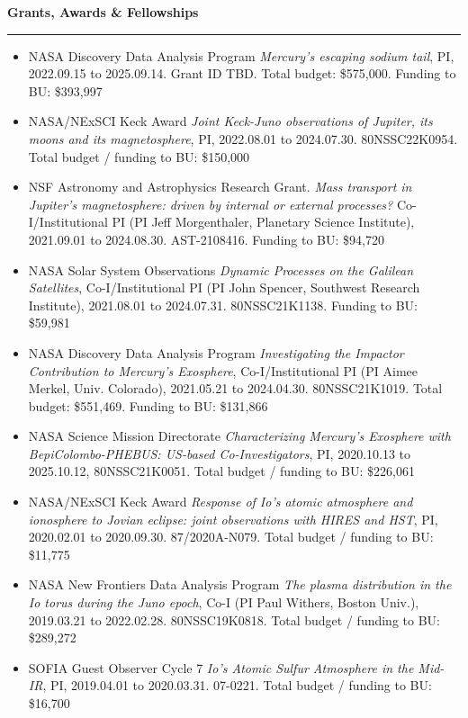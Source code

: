 \documentclass[12pt]{report}
\begin{document}
\noindent\bf{Grants, Awards \& Fellowships}\rm \hspace*{\fill} \\
\rule{\textwidth}{1pt}
\begin{itemize} \itemsep -2pt %

 \item NASA Discovery Data Analysis Program {\it  Mercury's escaping sodium tail}, PI, 2022.09.15 to 2025.09.14. Grant ID TBD. Total budget: \$575,000. Funding to BU: \$393,997
 \item NASA/NExSCI Keck Award {\it Joint Keck-Juno observations of Jupiter, its moons and its magnetosphere}, PI, 2022.08.01 to 2024.07.30. 80NSSC22K0954. Total budget / funding to BU: \$150,000
 \item NSF Astronomy and Astrophysics Research Grant. {\it Mass transport in Jupiter's magnetosphere: driven by internal or external processes?} Co-I/Institutional PI (PI Jeff Morgenthaler, Planetary Science Institute), 2021.09.01 to 2024.08.30. AST-2108416. Funding to BU: \$94,720
 \item NASA Solar System Observations {\it Dynamic Processes on the Galilean Satellites}, Co-I/Institutional PI (PI John Spencer, Southwest Research Institute), 2021.08.01 to 2024.07.31. 80NSSC21K1138. Funding to BU: \$59,981
 \item NASA Discovery Data Analysis Program {\it Investigating the Impactor Contribution to Mercury's Exosphere}, Co-I/Institutional PI (PI Aimee Merkel, Univ. Colorado), 2021.05.21 to 2024.04.30. 80NSSC21K1019. Total budget: \$551,469. Funding to BU: \$131,866
 \item NASA Science Mission Directorate {\it Characterizing Mercury’s Exosphere with BepiColombo-PHEBUS: US-based Co-Investigators}, PI, 2020.10.13 to 2025.10.12, 80NSSC21K0051. Total budget / funding to BU: \$226,061
 \item NASA/NExSCI Keck Award {\it Response of Io's atomic atmosphere and ionosphere to Jovian eclipse: joint observations with HIRES and HST}, PI, 2020.02.01 to 2020.09.30. 87/2020A-N079. Total budget / funding to BU: \$11,775
 \item NASA New Frontiers Data Analysis Program {\it The plasma distribution in the Io torus during the Juno epoch}, Co-I (PI Paul Withers, Boston Univ.), 2019.03.21 to 2022.02.28. 80NSSC19K0818. Total budget / funding to BU: \$289,272
 \item SOFIA Guest Observer Cycle 7 {\it Io's Atomic Sulfur Atmosphere in the Mid-IR}, PI, 2019.04.01 to 2020.03.31. 07-0221. Total budget / funding to BU: \$16,700

\end{itemize}
\end{document}
